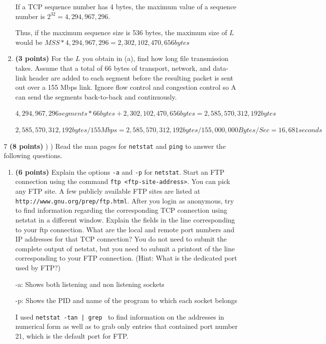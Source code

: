 \documentclass{article}
\begin{document}
\begin{enumerate}
\begin{enumerate}
  If a TCP sequence number has 4 bytes, the maximum value of a sequence number is $2^{32} = 4,294,967,296$. 

  Thus, if the maximum sequence size is 536 bytes, the maximum size of $L$ would be $MSS * 4,294,967,296 = 2,302,102,470,656 bytes$

  \item \textbf{(3 points)} For the $L$ you obtain in (a), find how long file transmission takes. Assume that a total of 66 bytes of transport, network, and data-link header are added to each segment before the resulting packet is sent out over a 155 Mbps link. Ignore flow control and congestion control so A can send the segments back-to-back and continuously.

  $4,294,967,296 segments * 66 bytes + 2,302,102,470,656 bytes =  2,585,570,312,192 bytes$

  $2,585,570,312,192 bytes / 155 Mbps = 2,585,570,312,192 bytes / 155,000,000 Bytes/Sec = 16,681 seconds$

  \end{enumerate}

\item[7]\textbf{(8 points)} ) ) Read the man pages for \texttt{netstat} and \texttt{ping} to answer the following questions.

  \begin{enumerate}
  \item \textbf{(6 points)} Explain the options \texttt{-a} and \texttt{-p} for \texttt{netstat}. Start an FTP connection using the command \texttt{ftp <ftp-site-address>}. You can pick any FTP site. A few publicly available FTP sites are listed at \texttt{http://www.gnu.org/prep/ftp.html}. After you login as anonymous, try to find information regarding the corresponding TCP connection using netstat in a different window. Explain the fields in the line corresponding to your ftp connection. What are the local and remote port numbers and IP addresses for that TCP connection? You do not need to submit the complete output of netstat, but you need to submit a printout of the line corresponding to your FTP connection. (Hint: What is the dedicated port used by FTP?)

  -a: Shows both listening and non listening sockets

  -p: Shows the PID and name of the program to which each socket belongs

  I used \texttt{netstat -tan | grep } to find information on the addresses in numerical form as well as to grab only entries that contained port number 21, which is the default port for FTP.


\end{enumerate}
\end{enumerate}
\end{document}
